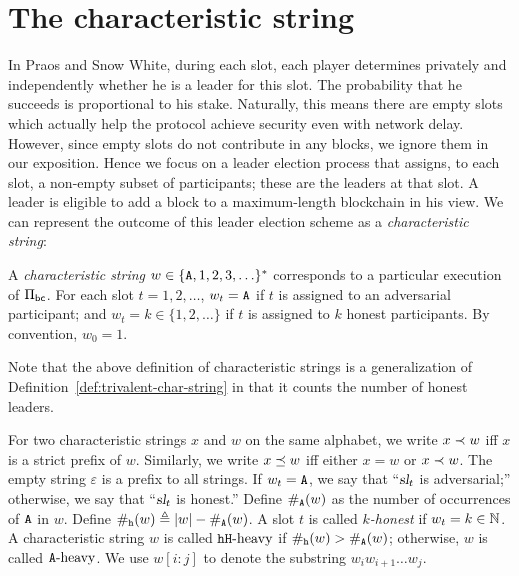 \section{The characteristic string}
In Praos and Snow White, 
during each slot, 
each player determines privately and independently 
whether he is a leader for this slot. 
The probability that he succeeds is proportional to his stake. 
Naturally, this means there are empty slots 
which actually help the protocol achieve 
security even with network delay. 
However, since empty slots do not contribute in any blocks, 
we ignore them in our exposition. 
Hence we focus on a leader election process that assigns, 
to each slot, 
a non-empty subset of participants; 
these are the leaders at that slot. 
A leader is eligible to add a block to a 
maximum-length blockchain in his view. 
We can represent the outcome of this leader election scheme 
as a \emph{characteristic string}:


\begin{definition}\label{def:char-string-praos}
  A \emph{characteristic string} $w \in \{\mathtt{A}, 1, 2, 3, \ldots \}^*$ 
  corresponds to a particular execution of $\Pi_\mathsf{bc}$.
  For each slot $t = 1, 2, \ldots$, 
  $w_t = \mathtt{A}$ if $t$ is assigned to an adversarial participant; and 
  $w_t = k \in \{1,2,\ldots\}$ if $t$ is assigned to $k$ honest participants.
  By convention, $w_0 = 1$.
\end{definition}

Note that the above definition of characteristic strings 
is a generalization of Definition~\ref{def:trivalent-char-string}
in that it counts the number of honest leaders. 


For two characteristic strings $x$ and $w$ on the same alphabet, 
we write $x \prec w$ iff $x$ is a strict prefix of $w$. 
Similarly, 
we write $x \preceq w$ iff either $x = w$ or $x \prec w$. 
The empty string $\varepsilon$ is a prefix to all strings. 
If $w_t = \mathtt{A}$, we say that ``$\textsl{sl}_t$ is adversarial;'' 
otherwise, we say that ``$\textsl{sl}_t$ is honest.'' 
Define $\#_{\mathtt{A}}(w)$ as the number of occurrences of $\mathtt{A}$ in $w$. 
Define $\#_{\mathtt{h}}(w) \triangleq |w| - \#_{\mathtt{A}}(w)$.
A slot $t$ is called \emph{$k$-honest} if $w_t = k \in \mathbb{N}$.
A characteristic string $w$ is called $\mathtt{h}\mathtt{H}\text{-heavy}$ if 
$\#_{\mathtt{h}}(w) > \#_{\mathtt{A}}(w)$; 
otherwise, $w$ is called $\mathtt{A}\text{-heavy}$. 
We use $w[i : j]$ to denote the substring $w_i w_{i+1}\ldots w_j$.








